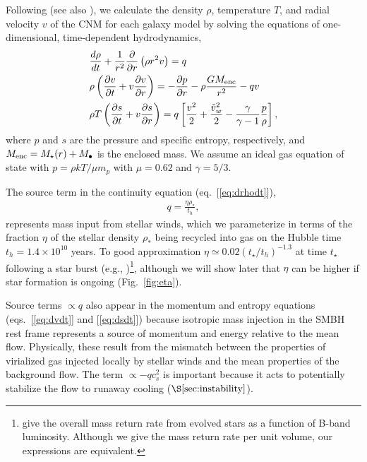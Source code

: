 \documentclass[usenatbib,fleqn]{mn2e}
\newcommand{\dxdy}[2]{\frac{d #1}{d #2} }
\newcommand{\drhodt}{\dxdy{\rho}{t}}
\newcommand{\ke}{\frac{v^2}{2}}
\newcommand{\kew}{\frac{\tilde{v}_{w}^2}{2}}
\newcommand{\gammaf}{\frac{\gamma}{\gamma-1}}
\newcommand{\cs}{\frac{p}{\rho}}
\newcommand{\rhostar}{\rho_*}
\newcommand{\Mbh}[1][]{M_{\bullet#1}}
\renewcommand{\th}{t_h}
\begin{document}
Following \citet{Quataert:2004a} (see also \citealt{HolzerAxford:1970a,De-ColleGuillochon+:2012a,ShcherbakovWong+:2014a}), we calculate the density $\rho$, temperature $T$, and radial velocity $v$ of the CNM for each galaxy model by solving the equations of one-dimensional, time-dependent hydrodynamics,
\begin{align}
  &\drhodt+\frac{1}{r^2}\frac{\partial}{\partial r}\left(\rho r^2 v\right)=q \label{eq:drhodt}\\
  &\rho \left(\frac{\partial v}{\partial t} + v\frac{\partial
      v}{\partial r}\right) =-\frac{\partial p}{\partial r}- \rho\frac{GM_{\rm enc}}{r^{2}} -q v \label{eq:dvdt}\\
  &\rho T\left(\frac{\partial s}{\partial t} + v\frac{\partial
      s}{\partial r}\right)=q\left[\ke+\kew-\gammaf \cs \right] 
, 
\label{eq:dsdt}
\end{align}
where $p$ and $s$ are the pressure and specific entropy, respectively, and $M_{\rm enc} = M_{\star}(r) + \Mbh$ is the
enclosed mass.  We assume an ideal gas equation of state with $p = \rho kT/\mu m_p$ with $\mu = 0.62$  and $\gamma = 5/3$. 

The source term in the continuity equation (eq.~[\ref{eq:drhodt}]),
\begin{align}
  q=\frac{\eta \rhostar}{\th},
\label{eq:q}
\end{align}
represents mass input from stellar winds, which we parameterize in
terms of the fraction $\eta$ of the stellar density $\rhostar$ being
recycled into gas on the Hubble time $\th = 1.4 \times 10^{10}$
years.  To good approximation $\eta\simeq 0.02 (t_{\star}/t_h)^{-1.3}$ at time $t_{\star}$ following a star burst (e.g., \citealt{Ciotti+91})\footnote{\citet{Ciotti+91} give the overall mass return rate from evolved stars as a function of B-band luminosity.  Although we give the mass return rate per unit volume, our expressions are equivalent.}, although we will show later that $\eta$ can be higher if star formation is ongoing (Fig.~\ref{fig:eta}).  

Source terms $\propto q$ also appear in the momentum and entropy
equations (eqs.~[\ref{eq:dvdt}] and [\ref{eq:dsdt}]) because isotropic
mass injection in the SMBH rest frame represents a source of momentum
and energy relative to the mean flow.  Physically, these result from
the mismatch between the properties of virialized gas injected locally
by stellar winds and the mean properties of the background flow.  The
term $\propto -q c_{s}^{2}$ is important because it acts to potentially stabilize the flow to runaway cooling ($\S\ref{sec:instability}$).
\end{document}
